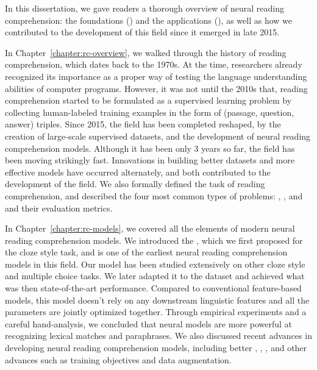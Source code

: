 

In this dissertation, we gave readers a thorough overview of neural reading comprehension: the foundations () and the applications (), as well as how we contributed to the development of this field since it emerged in late 2015.

In Chapter~\ref{chapter:rc-overview}, we walked through the history of reading comprehension, which dates back to the 1970s. At the time, researchers already recognized its importance as a proper way of testing the language understanding abilities of computer programs. However, it was not until the 2010s that, reading comprehension started to be formulated as a supervised learning problem by collecting human-labeled training examples in the form of (passage, question, answer) triples. Since 2015, the field has been completed reshaped, by the creation of large-scale supervised datasets, and the development of neural reading comprehension models.  Although it has been only 3 years so far, the field has been moving strikingly fast. Innovations in building better datasets and more effective models have occurred alternately, and both contributed to the development of the field. We also formally defined the task of reading comprehension, and described the four most common types of problems: , ,  and  and their evaluation metrics.


In Chapter~\ref{chapter:rc-models}, we covered all the elements of modern neural reading comprehension models. We introduced the , which we first proposed for the  cloze style task, and is one of the earliest neural reading comprehension models in this field. Our model has been studied extensively on other cloze style and multiple choice tasks. We later adapted it to the  dataset and achieved what was then state-of-the-art performance.  Compared to conventional feature-based models, this model doesn't rely on any downstream linguistic features and all the parameters are jointly optimized together. Through empirical experiments and a careful hand-analysis, we concluded that neural models are more powerful at recognizing lexical matches and paraphrases. We also discussed recent advances in developing neural reading comprehension models, including better , , , and other advances such as training objectives and data augmentation.

